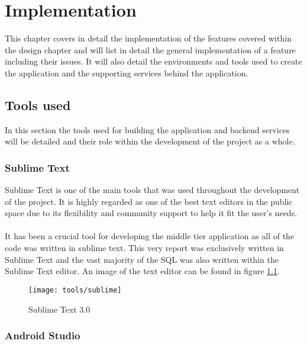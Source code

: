 \chapter{Implementation}

This chapter covers in detail the implementation of the features covered within the design chapter and will list in detail the general implementation of a feature including their issues. It will also detail the environments and tools used to create the application and the supporting services behind the application.

\section{Tools used}

In this section the tools used for building the application and backend services will be detailed and their role within the development of the project as a whole.

\subsection{Sublime Text}

Sublime Text is one of the main tools that was used throughout the development of the project. It is highly regarded as one of the best text editors in the public space due to its flexibility and community support to help it fit the user's needs.\\
\\
It has been a crucial tool for developing the middle tier application as all of the code was written in sublime text. This very report was exclusively written in Sublime Text and the vast majority of the SQL was also written within the Sublime Text editor. An image of the text editor can be found in figure \ref{fig:sublime_text_image}.

\begin{figure}[H]
    \centering
    \texttt{[image: tools/sublime]}
    \caption{Sublime Text 3.0}
    \label{fig:sublime_text_image}
\end{figure} 

\subsection{Android Studio}

